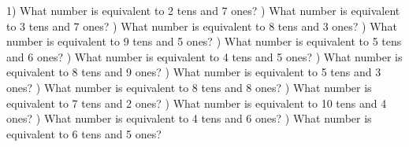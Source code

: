 \documentclass{article}%
\begin{document}
1) What number is equivalent to 2 tens and 7 ones?%
\newline%
\newline%
) What number is equivalent to 3 tens and 7 ones?%
\newline%
\newline%
) What number is equivalent to 8 tens and 3 ones?%
\newline%
\newline%
) What number is equivalent to 9 tens and 5 ones?%
\newline%
\newline%
) What number is equivalent to 5 tens and 6 ones?%
\newline%
\newline%
) What number is equivalent to 4 tens and 5 ones?%
\newline%
\newline%
) What number is equivalent to 8 tens and 9 ones?%
\newline%
\newline%
) What number is equivalent to 5 tens and 3 ones?%
\newline%
\newline%
) What number is equivalent to 8 tens and 8 ones?%
\newline%
\newline%
) What number is equivalent to 7 tens and 2 ones?%
\newline%
\newline%
) What number is equivalent to 10 tens and 4 ones?%
\newline%
\newline%
) What number is equivalent to 4 tens and 6 ones?%
\newline%
\newline%
) What number is equivalent to 6 tens and 5 ones?%
\newline%
\newline%
\newline%
\end{document}
